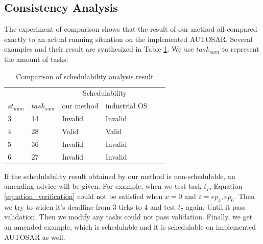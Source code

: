 \documentclass[conference]{IEEEtran}
\begin{document}
\subsection{Consistency Analysis} 
The experiment of comparison shows that the result of our method all compared exactly to an actual running situation on the implemented AUTOSAR. Several examples and their result are synthesized in Table \ref{table_compare}. We use $task_{sum}$ to represent the amount of tasks. %


\begin{table}[htbp]
  \centering
  \begin{tabular}{llllll}
    \toprule
    &&\multicolumn{2}{c}{Schedulability}\\
    \cmidrule{3-4}
    $st_{num}$ & $task_{sum}$ & our method & industrial OS\\
    \midrule
    3&14&Invalid&Invalid\\
    4&28&  Valid&    Valid\\
    5&36&Invalid&Invalid\\
    6&27&Invalid&Invalid\\
    
    \bottomrule
  \end{tabular}
  \caption{Comparison of schedulability analysis result}
  \label{table_compare}
\end{table}

If the schedulability result obtained by our method is non-schedulable, an amending advice will be given. For example, when we test task $t_7$, Equation \ref{equation_verification} could not be satisfied when $x=0$ and $\varepsilon={ep_4,ep_6}$. Then we try to widen it's deadline from 3 ticks to 4 and test $t_7$ again. Until it pass validation. 
Then we modify any tasks could not pass validation. Finally, we get an amended example, which is schedulable and it is schedulable on implemented AUTOSAR as well.

\end{document}
